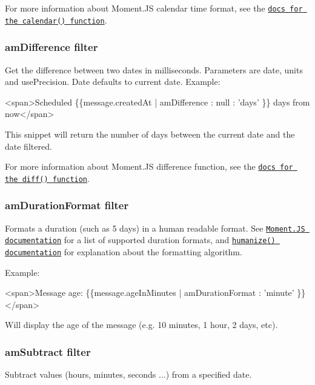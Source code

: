 For more information about Moment.\+JS calendar time format, see the \href{http://momentjs.com/docs/#/displaying/calendar-time/}{\tt docs for the calendar() function}.

\subsubsection*{am\+Difference filter}

Get the difference between two dates in milliseconds. Parameters are date, units and use\+Precision. Date defaults to current date. Example\+:


\begin{DoxyCode}
<span>Scheduled \{\{message.createdAt | amDifference : null : 'days' \}\} days from now</span>
\end{DoxyCode}


This snippet will return the number of days between the current date and the date filtered.

For more information about Moment.\+JS difference function, see the \href{http://momentjs.com/docs/#/displaying/difference/}{\tt docs for the diff() function}.

\subsubsection*{am\+Duration\+Format filter}

Formats a duration (such as 5 days) in a human readable format. See \href{http://momentjs.com/docs/#/durations/creating/}{\tt Moment.\+JS documentation} for a list of supported duration formats, and \href{http://momentjs.com/docs/#/durations/humanize/}{\tt {\ttfamily humanize() documentation}} for explanation about the formatting algorithm.

Example\+:


\begin{DoxyCode}
<span>Message age: \{\{message.ageInMinutes | amDurationFormat : 'minute' \}\}</span>
\end{DoxyCode}


Will display the age of the message (e.\+g. 10 minutes, 1 hour, 2 days, etc).

\subsubsection*{am\+Subtract filter}

Subtract values (hours, minutes, seconds ...) from a specified date.

